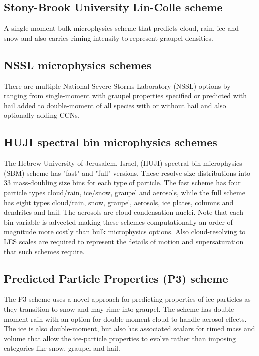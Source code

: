 \subsection {Stony-Brook University Lin-Colle scheme}
A single-moment bulk microphysics scheme \citep{lin11} that predicts cloud, rain, ice and snow and also carries riming intensity
to represent graupel densities.

\subsection {NSSL microphysics schemes}
There are multiple National Severe Storms Laboratory (NSSL) options by \citet{mansell10} ranging from single-moment with graupel
properties specified \citep{gilmore04} or predicted with hail added to double-moment of all species with or without hail and also optionally adding CCNs.

\subsection {HUJI spectral bin microphysics schemes}
The Hebrew University of Jerusalem, Israel, (HUJI) spectral bin microphysics (SBM) scheme has "fast" and "full" versions.
These resolve size distributions into 33 mass-doubling size bins for each type of particle. The fast scheme \citep{khain10} has four
particle types cloud/rain, ice/snow, graupel and aerosols, while the full scheme \citep{khain04} has eight types cloud/rain, snow, graupel, aerosols,
ice plates, columns and dendrites and hail. The aerosols are cloud condensation nuclei. Note that each bin variable is advected
making these schemes computationally an order of magnitude more costly than bulk microphysics options. Also cloud-resolving to LES
scales are required to represent the details of motion and supersaturation that such schemes require.

\subsection {Predicted Particle Properties (P3) scheme}
The P3 scheme \citep{morrison15} uses a novel approach for predicting properties of ice particles as they transition to
snow and may rime into graupel. The scheme has double-moment rain with an option for double-moment cloud to
handle aerosol effects. The ice is also double-moment, but also has associated scalars for rimed mass and volume that
allow the ice-particle properties to evolve rather than imposing categories like snow, graupel and hail.

